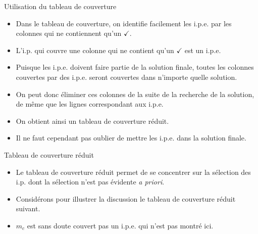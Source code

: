 \documentclass[presentation]{beamer}
\begin{document}
\begin{frame}[label={sec:org6d7bd44}]{Utilisation du tableau de couverture}
\begin{itemize}
\item Dans le tableau de couverture, on identifie facilement les i.p.e. par les colonnes qui ne contiennent qu'un \(\checkmark\).

\item L'i.p. qui couvre une colonne qui ne contient qu'un \(\checkmark\) est un i.p.e.

\item Puisque les i.p.e. doivent faire partie de la solution finale, toutes les colonnes couvertes par des i.p.e. seront couvertes dans n'importe quelle solution.

\item On peut donc éliminer ces colonnes de la suite de la recherche de la solution, de même que les lignes correspondant aux i.p.e.

\item On obtient ainsi un tableau de couverture \alert{réduit}.

\item \alert{Il ne faut cependant pas oublier de mettre les i.p.e. dans la solution finale.}
\end{itemize}
\end{frame}

\begin{frame}[label={sec:org52eec3d}]{Tableau de couverture réduit}
\begin{itemize}
\item Le tableau de couverture réduit permet de se concentrer sur la sélection des i.p. dont la sélection n'est pas évidente \emph{a priori}.

\item Considérons pour illustrer la discussion le tableau de couverture réduit suivant.

\item \(m_c\) est sans doute couvert pas un i.p.e. qui n'est pas montré ici.
\end{itemize}
\end{frame}
\end{document}

